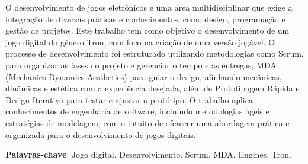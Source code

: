 \begin{resumo}
O desenvolvimento de jogos eletrônicos é uma área multidisciplinar que exige a integração de diversas práticas e conhecimentos, como design, programação e gestão de projetos. Este trabalho tem como objetivo o desenvolvimento de um jogo digital do gênero Tron, com foco na criação de uma versão jogável. O processo de desenvolvimento foi estruturado utilizando metodologias como Scrum, para organizar as fases do projeto e gerenciar o tempo e as entregas, MDA (Mechanics-Dynamics-Aesthetics) para guiar o design, alinhando mecânicas, dinâmicas e estética com a experiência desejada, além de Prototipagem Rápida e Design Iterativo para testar e ajustar o protótipo. O trabalho aplica conhecimentos de engenharia de software, incluindo metodologias ágeis e estratégias de modelagem, com o intuito de oferecer uma abordagem prática e organizada para o desenvolvimento de jogos digitais.

\vspace{\onelineskip}

\noindent
\textbf{Palavras-chave}: Jogo digital. Desenvolvimento. Scrum. MDA. Engines. Tron.
\end{resumo}

